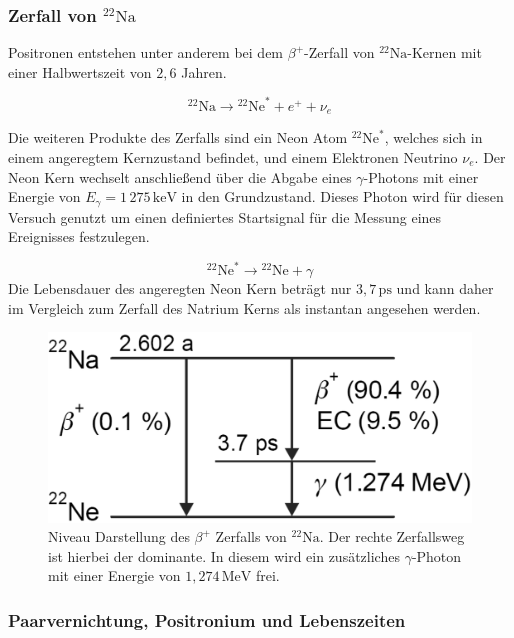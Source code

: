 \documentclass[numbers=noenddot,12pt,a4paper]{scrartcl}
\begin{document}
		\subsubsection{Zerfall von $^{22}\textrm{Na}$}
	
			Positronen entstehen unter anderem bei dem $\beta^+$-Zerfall von $^{22}\textrm{Na}$-Kernen mit einer Halbwertszeit von $2,6$ Jahren.
	
			\begin{equation}
				^{22}\textrm{Na} \rightarrow {}^{22}\textrm{Ne}^* + e^+ + \nu_e
			\end{equation}
	
			Die weiteren Produkte des Zerfalls sind ein Neon Atom ${}^{22}\textrm{Ne}^*$, welches sich in einem angeregtem Kernzustand befindet, und einem Elektronen Neutrino $\nu_e$. Der Neon Kern wechselt anschließend über die Abgabe eines $\gamma$-Photons mit einer Energie von $E_\gamma = 1\,275\,\mathrm{keV}$ in den Grundzustand. Dieses Photon wird für diesen Versuch genutzt um einen definiertes Startsignal für die Messung eines Ereignisses festzulegen.
			
			\begin{equation}
				{}^{22}\textrm{Ne}^* \rightarrow {}^{22}\textrm{Ne} + \gamma
			\end{equation}
			Die Lebensdauer des angeregten Neon Kern beträgt nur $3,7\,\mathrm{ps}$ und kann daher im Vergleich zum Zerfall des Natrium Kerns als instantan angesehen werden. 
	
		
		\begin{figure}[!h]
			\centering
			\label{abb:zerfall}
			\includegraphics[width=0.5\columnwidth]{pics/termschema}
			\caption{Niveau Darstellung des $\beta^+$ Zerfalls von ${}^{22}\textrm{Na}$. Der rechte Zerfallsweg ist hierbei der dominante. In diesem wird ein zusätzliches $\gamma$-Photon mit einer Energie von $1,274\,\mathrm{MeV}$ frei.}
		\end{figure}
	
		\subsubsection{Paarvernichtung, Positronium und Lebenszeiten}
	
\end{document}
